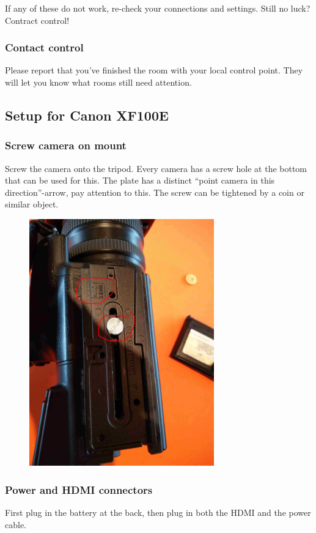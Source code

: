 \documentclass{article}
\begin{document}
If any of these do not work, re-check your connections and settings. Still no luck? Contract control!

\subsubsection{Contact control}
Please report that you've finished the room with your local control point.
They will let you know what rooms still need attention.

\subsection{Setup for Canon XF100E}

\subsubsection{Screw camera on mount}
Screw the camera onto the tripod. Every camera has a screw hole at the bottom that can be used for this. The plate has a distinct ``point camera in this direction''-arrow, pay attention to this. The screw can be tightened by a coin or similar object.

\begin{figure}[H]
  \centering
  \includegraphics[width = 80mm]{Cam00.jpg}
\end{figure}


\subsubsection{Power and HDMI connectors}
First plug in the battery at the back, then plug in both the HDMI and the power cable.
\end{document}
